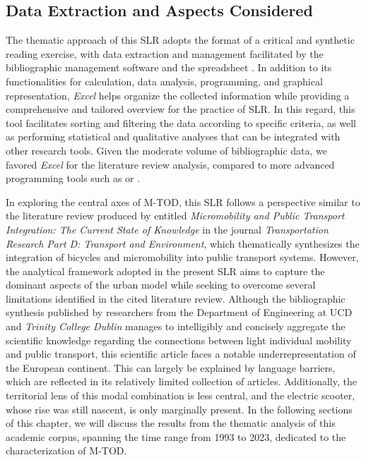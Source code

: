 \begin{refsegment}
\subsection{Data Extraction and Aspects Considered
    \label{chap2:extraction-donnees-aspects-consideres}
    }
    
The thematic approach of this \acrshort{SLR} adopts the format of a critical and synthetic reading exercise, with data extraction and management facilitated by the bibliographic management software  and the spreadsheet . In addition to its functionalities for calculation, data analysis, programming, and graphical representation, \textsl{Excel} helps organize the collected information while providing a comprehensive and tailored overview for the practice of \acrshort{SLR}. In this regard, this tool facilitates sorting and filtering the data according to specific criteria, as well as performing statistical and qualitative analyses that can be integrated with other research tools. Given the moderate volume of bibliographic data, we favored \textsl{Excel} for the literature review analysis, compared to more advanced programming tools such as  or .%


In exploring the central axes of \acrshort{M-TOD}, this \acrshort{SLR} follows a perspective similar to the literature review produced by \textcolor{blue}{\textcite[5]{oeschger_micromobility_2020}} entitled \foreignlanguage{english}{\textsl{Micromobility and Public Transport Integration: The Current State of Knowledge}} in the journal \foreignlanguage{english}{\textsl{Transportation Research Part D: Transport and Environment}}, which thematically synthesizes the integration of bicycles and micromobility into public transport systems. However, the analytical framework adopted in the present \acrshort{SLR} aims to capture the dominant aspects of the urban model while seeking to overcome several limitations identified in the cited literature review. Although the bibliographic synthesis published by researchers from the Department of Engineering at \acrfull{UCD} and \textsl{Trinity College Dublin} manages to intelligibly and concisely aggregate the scientific knowledge regarding the connections between light individual mobility and public transport, this scientific article faces a notable underrepresentation of the European continent. This can largely be explained by language barriers, which are reflected in its relatively limited collection of articles. Additionally, the territorial lens of this modal combination is less central, and the electric scooter, whose rise was still nascent, is only marginally present. In the following sections of this chapter, we will discuss the results from the thematic analysis of this academic corpus, spanning the time range from 1993 to 2023, dedicated to the characterization of \acrshort{M-TOD}.%


\end{refsegment}
